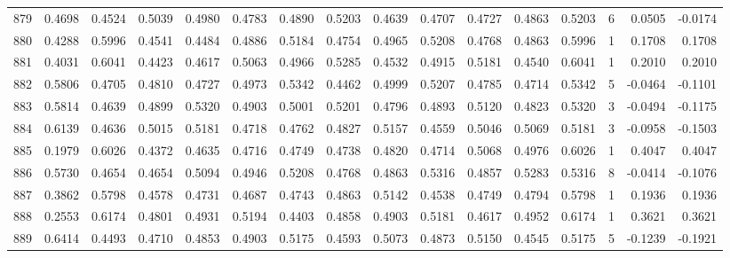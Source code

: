 \begin{tabular}{lrrrrrrrrrrrrrrr}
879 &      0.4698 &  0.4524 &  0.5039 &  0.4980 &  0.4783 &  0.4890 &  0.5203 &  0.4639 &  0.4707 &  0.4727 &   0.4863 &     0.5203 &      6 &                    0.0505 &                    -0.0174 \\
880 &      0.4288 &  0.5996 &  0.4541 &  0.4484 &  0.4886 &  0.5184 &  0.4754 &  0.4965 &  0.5208 &  0.4768 &   0.4863 &     0.5996 &      1 &                    0.1708 &                     0.1708 \\
881 &      0.4031 &  0.6041 &  0.4423 &  0.4617 &  0.5063 &  0.4966 &  0.5285 &  0.4532 &  0.4915 &  0.5181 &   0.4540 &     0.6041 &      1 &                    0.2010 &                     0.2010 \\
882 &      0.5806 &  0.4705 &  0.4810 &  0.4727 &  0.4973 &  0.5342 &  0.4462 &  0.4999 &  0.5207 &  0.4785 &   0.4714 &     0.5342 &      5 &                   -0.0464 &                    -0.1101 \\
883 &      0.5814 &  0.4639 &  0.4899 &  0.5320 &  0.4903 &  0.5001 &  0.5201 &  0.4796 &  0.4893 &  0.5120 &   0.4823 &     0.5320 &      3 &                   -0.0494 &                    -0.1175 \\
884 &      0.6139 &  0.4636 &  0.5015 &  0.5181 &  0.4718 &  0.4762 &  0.4827 &  0.5157 &  0.4559 &  0.5046 &   0.5069 &     0.5181 &      3 &                   -0.0958 &                    -0.1503 \\
885 &      0.1979 &  0.6026 &  0.4372 &  0.4635 &  0.4716 &  0.4749 &  0.4738 &  0.4820 &  0.4714 &  0.5068 &   0.4976 &     0.6026 &      1 &                    0.4047 &                     0.4047 \\
886 &      0.5730 &  0.4654 &  0.4654 &  0.5094 &  0.4946 &  0.5208 &  0.4768 &  0.4863 &  0.5316 &  0.4857 &   0.5283 &     0.5316 &      8 &                   -0.0414 &                    -0.1076 \\
887 &      0.3862 &  0.5798 &  0.4578 &  0.4731 &  0.4687 &  0.4743 &  0.4863 &  0.5142 &  0.4538 &  0.4749 &   0.4794 &     0.5798 &      1 &                    0.1936 &                     0.1936 \\
888 &      0.2553 &  0.6174 &  0.4801 &  0.4931 &  0.5194 &  0.4403 &  0.4858 &  0.4903 &  0.5181 &  0.4617 &   0.4952 &     0.6174 &      1 &                    0.3621 &                     0.3621 \\
889 &      0.6414 &  0.4493 &  0.4710 &  0.4853 &  0.4903 &  0.5175 &  0.4593 &  0.5073 &  0.4873 &  0.5150 &   0.4545 &     0.5175 &      5 &                   -0.1239 &                    -0.1921 \\

\end{tabular}
